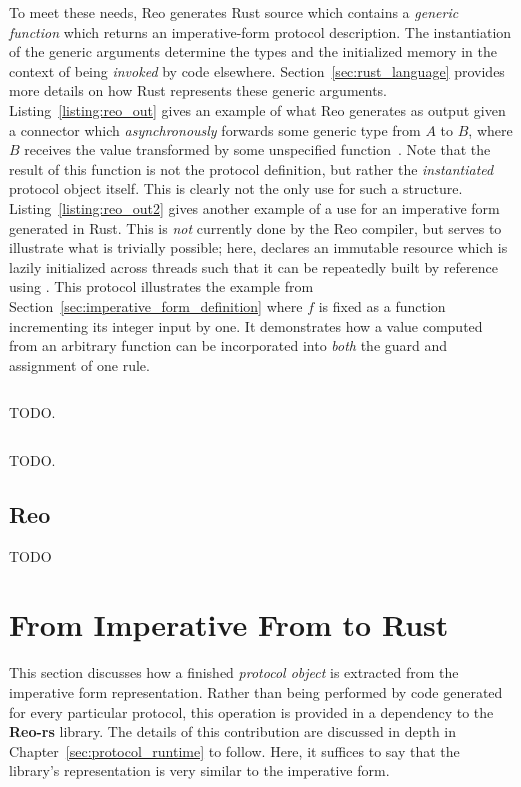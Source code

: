 To meet these needs, Reo generates Rust source which contains a \textit{generic function} which returns an imperative-form protocol description. The instantiation of the generic arguments determine the types and the initialized memory in the context of being \textit{invoked} by code elsewhere. Section~\ref{sec:rust_language} provides more details on how Rust represents these generic arguments. Listing~\ref{listing:reo_out} gives an example of what Reo generates as output given a connector which \textit{asynchronously} forwards some generic type  from $A$ to $B$, where $B$ receives the value transformed by some unspecified function~. Note that the result of this function is not the protocol definition, but rather the \textit{instantiated} protocol object itself. This is clearly not the only use for such a structure. Listing~\ref{listing:reo_out2} gives another example of a use for an imperative form generated in Rust. This is \textit{not} currently done by the Reo compiler, but serves to illustrate what is trivially possible; here,  declares an immutable resource which is lazily initialized across threads such that it can be repeatedly built by reference using . This protocol illustrates the example from Section~\ref{sec:imperative_form_definition} where $f$ is fixed as a function incrementing its integer input by one. It demonstrates how a value computed from an arbitrary function can be incorporated into \textit{both} the guard and assignment of one rule.


\begin{listing}[ht]
	\centering
	\inputminted[]{rust}{reo_out.rs}
	\caption[TODO]{TODO.}
	\label{listing:reo_out}
\end{listing}

\begin{listing}[ht]
\centering
\inputminted[]{rust}{reo_out2.rs}
\caption[TODO]{TODO.}
\label{listing:reo_out2}
\end{listing}

\subsection{Reo}
TODO

\section{From Imperative From to Rust}
This section discusses how a finished \textit{protocol object} is extracted from the imperative form representation. 
Rather than being performed by code generated for every particular protocol, this operation is provided in a dependency to the \textbf{Reo-rs} library. The details of this contribution are discussed in depth in Chapter~\ref{sec:protocol_runtime} to follow. Here, it suffices to say that the library's representation is very similar to the imperative form.

